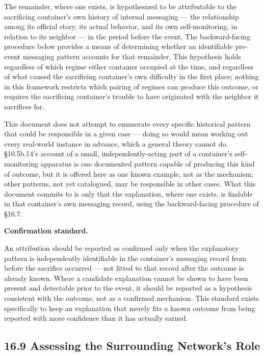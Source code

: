 \documentclass[
]{article}
\begin{document}
The remainder, where one exists, is hypothesized to be attributable to
the sacrificing container's own history of internal messaging --- the
relationship among its official story, its actual behavior, and its own
self-monitoring, in relation to its neighbor --- in the period before
the event. The backward-facing procedure below provides a means of
determining whether an identifiable pre-event messaging pattern accounts
for that remainder. This hypothesis holds regardless of which regime
either container occupied at the time, and regardless of what caused the
sacrificing container's own difficulty in the first place; nothing in
this framework restricts which pairing of regimes can produce this
outcome, or requires the sacrificing container's trouble to have
originated with the neighbor it sacrifices for.

This document does not attempt to enumerate every specific historical
pattern that could be responsible in a given case --- doing so would
mean working out every real-world instance in advance, which a general
theory cannot do. §10.5b.14's account of a small, independently-acting
part of a container's self-monitoring apparatus is one documented
pattern capable of producing this kind of outcome, but it is offered
here as one known example, not as the mechanism; other patterns, not yet
catalogued, may be responsible in other cases. What this document
commits to is only that the explanation, where one exists, is findable
in that container's own messaging record, using the backward-facing
procedure of §16.7.

\textbf{Confirmation standard.}

An attribution should be reported as confirmed only when the explanatory
pattern is independently identifiable in the container's messaging
record from before the sacrifice occurred --- not fitted to that record
after the outcome is already known. Where a candidate explanation cannot
be shown to have been present and detectable prior to the event, it
should be reported as a hypothesis consistent with the outcome, not as a
confirmed mechanism. This standard exists specifically to keep an
explanation that merely fits a known outcome from being reported with
more confidence than it has actually earned.

\hypertarget{assessing-the-surrounding-networks-role}{%
\subsection{16.9 Assessing the Surrounding Network's
Role}\label{assessing-the-surrounding-networks-role}}
\end{document}
